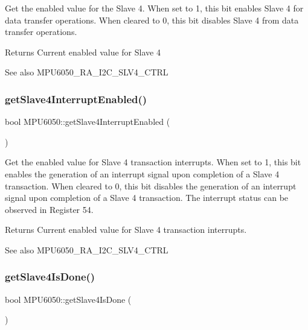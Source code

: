 Get the enabled value for the Slave 4. When set to 1, this bit enables Slave 4 for data transfer operations. When cleared to 0, this bit disables Slave 4 from data transfer operations. \begin{DoxyReturn}{Returns}
Current enabled value for Slave 4 
\end{DoxyReturn}
\begin{DoxySeeAlso}{See also}
M\+P\+U6050\+\_\+\+R\+A\+\_\+\+I2\+C\+\_\+\+S\+L\+V4\+\_\+\+C\+T\+RL 
\end{DoxySeeAlso}
\mbox{\label{class_m_p_u6050_a051549bcfa2eeb848c8557fc3efe74da}} 
\subsubsection{\texorpdfstring{getSlave4InterruptEnabled()}{getSlave4InterruptEnabled()}}
{\footnotesize\ttfamily bool M\+P\+U6050\+::get\+Slave4\+Interrupt\+Enabled (\begin{DoxyParamCaption}{ }\end{DoxyParamCaption})}

Get the enabled value for Slave 4 transaction interrupts. When set to 1, this bit enables the generation of an interrupt signal upon completion of a Slave 4 transaction. When cleared to 0, this bit disables the generation of an interrupt signal upon completion of a Slave 4 transaction. The interrupt status can be observed in Register 54.

\begin{DoxyReturn}{Returns}
Current enabled value for Slave 4 transaction interrupts. 
\end{DoxyReturn}
\begin{DoxySeeAlso}{See also}
M\+P\+U6050\+\_\+\+R\+A\+\_\+\+I2\+C\+\_\+\+S\+L\+V4\+\_\+\+C\+T\+RL 
\end{DoxySeeAlso}
\mbox{\label{class_m_p_u6050_a105aefe645e7021f9ba4397e9df4114c}} 
\subsubsection{\texorpdfstring{getSlave4IsDone()}{getSlave4IsDone()}}
{\footnotesize\ttfamily bool M\+P\+U6050\+::get\+Slave4\+Is\+Done (\begin{DoxyParamCaption}{ }\end{DoxyParamCaption})}

